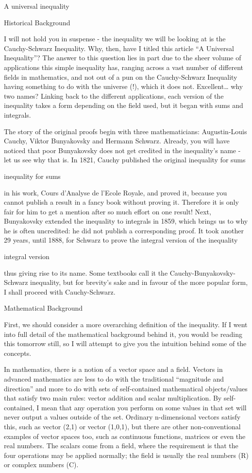 A universal inequality

Historical Background

I will not hold you in suspense - the inequality we will be looking at is the Cauchy-Schwarz Inequality. Why, then, have I titled this article “A Universal Inequality”? The answer to this question lies in part due to the sheer volume of applications this simple inequality has, ranging across a vast number of different fields in mathematics, and not out of a pun on the Cauchy-Schwarz Inequality having something to do with the universe (!), which it does not. Excellent… why two names? Linking back to the different applications, each version of the inequality takes a form depending on the field used, but it began with sums and integrals.

The story of the original proofs begin with three mathematicians: Augustin-Louis Cauchy, Viktor Bunyakovsky and Hermann Schwarz. Already, you will have noticed that poor Bunyakovsky does not get credited in the inequality’s name - let us see why that is. In 1821, Cauchy published the original inequality for sums

{inequality for sums}

in his work, Cours d’Analyse de l’Ecole Royale, and proved it, because you cannot publish a result in a fancy book without proving it. Therefore it is only fair for him to get a mention after so much effort on one result! Next, Bunyakovsky extended the inequality to integrals in 1859, which brings us to why he is often uncredited: he did not publish a corresponding proof. It took another 29 years, until 1888, for Schwarz to prove the integral version of the inequality

{integral version}

thus giving rise to its name. Some textbooks call it the Cauchy-Bunyakovsky-Schwarz inequality, but for brevity’s sake and in favour of the more popular form, I shall proceed with Cauchy-Schwarz.

Mathematical Background

First, we should consider a more overarching definition of the inequality. If I went into full detail of the mathematical background behind it, you would be reading this tomorrow still, so I will attempt to give you the intuition behind some of the concepts.

In mathematics, there is a notion of a vector space and a field. Vectors in advanced mathematics are less to do with the traditional “magnitude and direction” and more to do with sets of self-contained mathematical objects/values that satisfy two main rules: vector addition and scalar multiplication. By self-contained, I mean that any operation you perform on some values in that set will never output a values outside of the set. Ordinary n-dimensional vectors satisfy this, such as {vector (2,1)} or {vector (1,0,1)}, but there are other non-conventional examples of vector spaces too, such as continuous functions, matrices or even the real numbers. The scalars come from a field, where the requirement is that the four operations may be applied normally; the field is usually the real numbers (R) or complex numbers (C).

